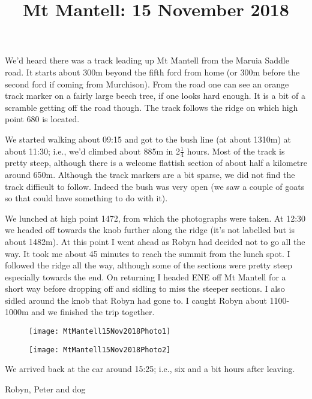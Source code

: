 \documentclass[12pt]{article} %
\title{Mt Mantell: 15 November 2018}
\makeatletter
\renewcommand{\maketitle}{%
  {\bfseries{\scshape{\Large{\@title\par}}}}
}
\makeatother
\begin{document}
  \maketitle

We'd heard there was a track leading up Mt Mantell from the Maruia Saddle road.  It starts about 300m beyond the fifth ford from home (or 300m before the second ford if coming from Murchison).  From the road one can see an orange track marker on a fairly large beech tree, if one looks hard enough.  It is a bit of a scramble getting off the road though.  The track follows the ridge on which high point 680 is located.

We started walking about 09:15 and got to the bush line (at about 1310m) at about 11:30; i.e., we'd climbed about 885m in 2$\frac{1}{4}$ hours.  Most of the track is pretty steep, although there is a welcome flattish section of about half a kilometre around 650m.  Although the track markers are a bit sparse, we did not find the track difficult to follow.  Indeed the bush was very open (we saw a couple of goats so that could have something to do with it).

We lunched at high point 1472, from which the photographs were taken.  At 12:30 we headed off towards the knob further along the ridge (it's not labelled but is about 1482m).  At this point I went ahead as Robyn had decided not to go all the way.  It took me about 45 minutes to reach the summit from the lunch spot.  I followed the ridge all the way, although some of the sections were pretty steep especially towards the end.  On returning I headed ENE off Mt Mantell for a short way before dropping off and sidling to miss the steeper sections.  I also sidled around the knob that Robyn had gone to. I caught Robyn about 1100-1000m and we finished the trip together.

\begin{figure}[ht]
\begin{minipage}{.5\linewidth}
\begin{flushleft}
   \texttt{[image: MtMantell15Nov2018Photo1]}
\end{flushleft}
\end{minipage}
\begin{minipage}{.5\linewidth}
\begin{flushright}
    \texttt{[image: MtMantell15Nov2018Photo2]}
\end{flushright}
\end{minipage}
\end{figure}

We arrived back at the car around 15:25; i.e., six and a bit hours after leaving.

\begin{flushright}
Robyn, Peter and dog
\end{flushright}
\end{document}

